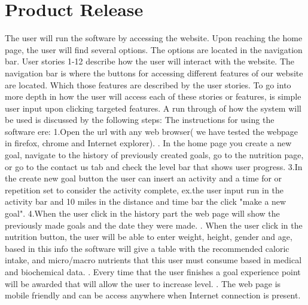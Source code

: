 \documentclass[a4paper]{article}
\begin{document}
\section{Product Release}
The user will run the software by accessing the website. Upon reaching the home page, the user
will find several options. The options are located in the navigation bar. User stories
1-12 describe how the user will interact with the website. The navigation bar is where the buttons
for accessing different features of our website are located. Which those features are described by
the user stories. To go into more depth in how the user will access each of these stories or features,
is simple user input upon clicking targeted features. A run through of how the system will be used is
discussed by the following steps:
\newline
\newline
The instructions for using the software ere:
\newline
\newline
1.Open the url with any web browser( we have tested the webpage in firefox, chrome and Internet explorer).
\newline
{}. In the home page you create a new goal, navigate to the history of previously created goals, go to the nutrition page, or go to the contact us tab and check the level bar that shows user progress.
\newline
\newline
3.In the create new goal button the user can insert an activity and a time for or repetition set to consider the activity complete, ex.the user input run in the activity bar and 10 miles in the distance and time bar the click "make a new goal".
\newline
\newline
4.When the user click in the history part the web page will show the previously made goals and the date they were made.
\newline
{}. When the user click in the nutrition button, the user will be able to enter weight, height, gender and age, based in this info the software will give a table with the recommended caloric intake, and micro/macro nutrients that this user must consume based in medical and biochemical data. 
\newline
{}. Every time that the user finishes a goal experience point will be awarded that will allow the user to increase level.
\newline
{}. The web page is mobile friendly and can be access anywhere when Internet connection is present.
\newline
\newline
\end{document}
